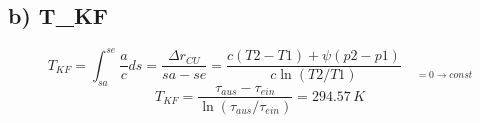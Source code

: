 \subsection*{b) T_{KF}}

\[
T_{KF} = \int_{sa}^{se} \frac{a}{c} ds = \frac{\Delta r_{CU}}{sa - se} = \frac{c (T2 - T1) + \psi (p2 - p1)}{c \ln (T2 / T1)} \quad \underset{=0 \rightarrow const}{}
\]
\[
T_{KF} = \frac{\tau_{aus} - \tau_{ein}}{\ln (\tau_{aus} / \tau_{ein})} = 294.57 \, K
\]